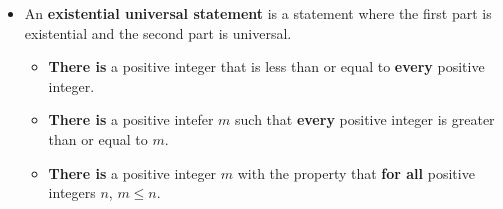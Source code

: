 \begin{itemize}
    \item An \textbf{existential universal statement} is a statement where the first part is existential and the second part is universal.
    \begin{itemize}
        \item \textbf{There is} a positive integer that is less than or equal to \textbf{every} positive integer.
        \item \textbf{There is} a positive intefer $m$ such that \textbf{every} positive integer is greater than or equal to $m$.
        \item \textbf{There is} a positive integer $m$ with the property that \textbf{for all} positive integers $n$, $m \leq n$.
    \end{itemize}
\end{itemize}